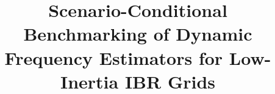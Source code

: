 \title{Scenario-Conditional Benchmarking of Dynamic Frequency Estimators for Low-Inertia IBR Grids}
